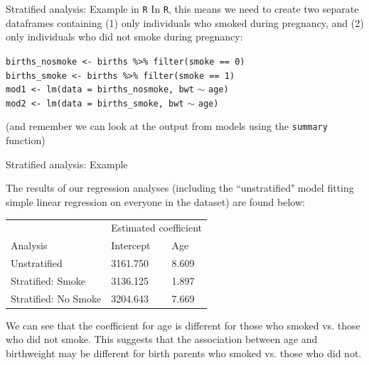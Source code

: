 \documentclass[10pt,t]{beamer}
\begin{document}
\begin{frame}{Stratified analysis: Example in \texttt{R}}
In \texttt{R}, this means we need to create two separate dataframes containing (1) only individuals who smoked during pregnancy, and (2) only individuals who did not smoke during pregnancy:

\vspace{0.3cm}

\texttt{births\_nosmoke <- births \%>\% filter(smoke == 0)} \\
\texttt{births\_smoke <- births \%>\% filter(smoke == 1)} \\
\texttt{mod1 <- lm(data = births\_nosmoke, bwt} $\sim$ \texttt{age)} \\
\texttt{mod2 <- lm(data = births\_smoke, bwt} $\sim$ \texttt{age)}

\vspace{0.3cm}

(and remember we can look at the output from models using the \texttt{summary} function)

\end{frame}

\begin{frame}{Stratified analysis: Example}

The results of our regression analyses (including the ``unstratified" model fitting simple linear regression on everyone in the dataset) are found below:

\vspace{0.3cm}

\begin{table}
	\centering
	\begin{tabular}{lll}
		& \multicolumn{2}{l}{Estimated coefficient} \\
		\multicolumn{1}{l|}{Analysis}             & \multicolumn{1}{l|}{Intercept}        & Age         \\ \hline
		\multicolumn{1}{l|}{Unstratified}           & \multicolumn{1}{l|}{3161.750}         & 8.609       \\ \hline
		\multicolumn{1}{l|}{Stratified: Smoke}    & \multicolumn{1}{l|}{3136.125}         & 1.897       \\ \hline
		\multicolumn{1}{l|}{Stratified: No Smoke} & \multicolumn{1}{l|}{3204.643}         & 7.669      
	\end{tabular}
\end{table}

\vspace{0.3cm}

We can see that the coefficient for age is different for those who smoked vs. those who did not smoke. This suggests that the association between age and birthweight may be different for birth parents who smoked vs. those who did not. 

\end{frame}
\end{document}
